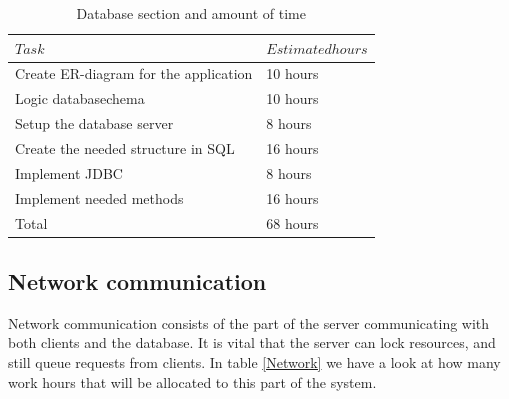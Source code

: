 \documentclass[a4paper, english, 12pt]{article}
\begin{document}
\begin{table}[h!]
    \begin{center}
    \caption{Database section and amount of time} 
    \label{database}
    \vspace{0,5cm}
    \begin{tabular}{ll} \\ 
        \hline
        $Task$ & $Estimated hours$\\
        \hline 
    Create ER-diagram for the application & 10 hours\\
    Logic databasechema & 10 hours\\    
    Setup the database server & 8 hours\\
    Create the needed structure in SQL & 16 hours\\
    Implement JDBC & 8 hours\\
    Implement needed methods & 16 hours\\
    \hline 
    Total & 68 hours \\
    \hline
    \end{tabular}
    \end{center}
\end{table}

\subsection{Network communication}
Network communication consists of the part of the server communicating with both clients and the database. It is vital that the server can lock resources, and still queue requests from clients. In table \ref{Network} we have a look at how many work hours that will be allocated to this part of the system.
\end{document}
